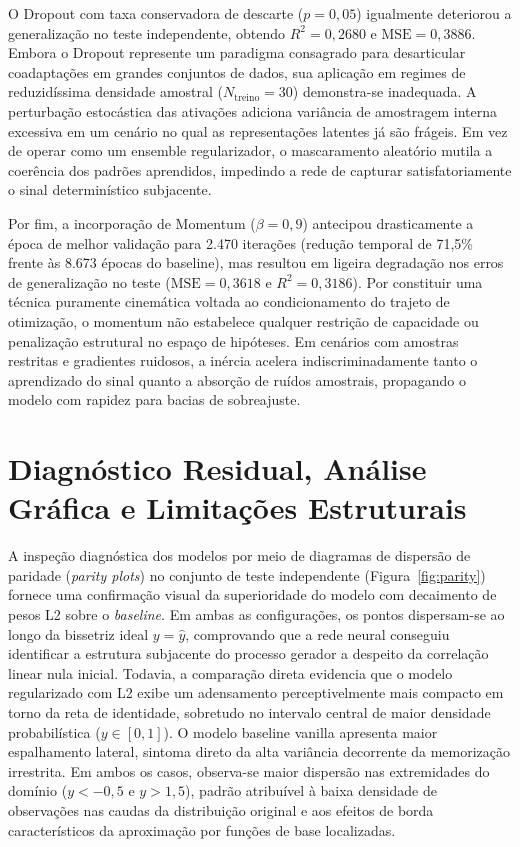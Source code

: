 \documentclass[11pt,a4paper]{article}
\begin{document}
O Dropout com taxa conservadora de descarte ($p = 0{,}05$) igualmente deteriorou a generalização no teste independente, obtendo $R^2 = 0{,}2680$ e $\mathrm{MSE} = 0{,}3886$. Embora o Dropout represente um paradigma consagrado para desarticular coadaptações em grandes conjuntos de dados, sua aplicação em regimes de reduzidíssima densidade amostral ($N_{\mathrm{treino}} = 30$) demonstra-se inadequada. A perturbação estocástica das ativações adiciona variância de amostragem interna excessiva em um cenário no qual as representações latentes já são frágeis. Em vez de operar como um ensemble regularizador, o mascaramento aleatório mutila a coerência dos padrões aprendidos, impedindo a rede de capturar satisfatoriamente o sinal determinístico subjacente.

Por fim, a incorporação de Momentum ($\beta = 0{,}9$) antecipou drasticamente a época de melhor validação para 2.470 iterações (redução temporal de 71,5\% frente às 8.673 épocas do baseline), mas resultou em ligeira degradação nos erros de generalização no teste ($\mathrm{MSE} = 0{,}3618$ e $R^2 = 0{,}3186$). Por constituir uma técnica puramente cinemática voltada ao condicionamento do trajeto de otimização, o momentum não estabelece qualquer restrição de capacidade ou penalização estrutural no espaço de hipóteses. Em cenários com amostras restritas e gradientes ruidosos, a inércia acelera indiscriminadamente tanto o aprendizado do sinal quanto a absorção de ruídos amostrais, propagando o modelo com rapidez para bacias de sobreajuste.

\section{Diagnóstico Residual, Análise Gráfica e Limitações Estruturais}

A inspeção diagnóstica dos modelos por meio de diagramas de dispersão de paridade (\textit{parity plots}) no conjunto de teste independente (Figura~\ref{fig:parity}) fornece uma confirmação visual da superioridade do modelo com decaimento de pesos L2 sobre o \textit{baseline}. Em ambas as configurações, os pontos dispersam-se ao longo da bissetriz ideal $y = \hat{y}$, comprovando que a rede neural conseguiu identificar a estrutura subjacente do processo gerador a despeito da correlação linear nula inicial. Todavia, a comparação direta evidencia que o modelo regularizado com L2 exibe um adensamento perceptivelmente mais compacto em torno da reta de identidade, sobretudo no intervalo central de maior densidade probabilística ($y \in [0, 1]$). O modelo baseline vanilla apresenta maior espalhamento lateral, sintoma direto da alta variância decorrente da memorização irrestrita. Em ambos os casos, observa-se maior dispersão nas extremidades do domínio ($y < -0{,}5$ e $y > 1{,}5$), padrão atribuível à baixa densidade de observações nas caudas da distribuição original e aos efeitos de borda característicos da aproximação por funções de base localizadas.
\end{document}
